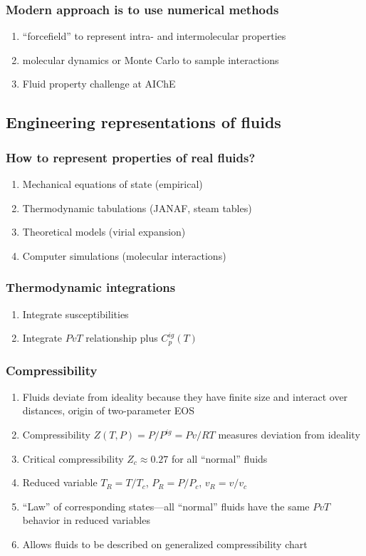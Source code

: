 \documentclass[11pt]{article}
\begin{document}
\subsubsection{Modern approach is to use numerical methods}
\label{sec:orgd56a107}
\begin{enumerate}
\item ``forcefield'' to represent intra- and intermolecular properties
\item molecular dynamics or Monte Carlo to sample interactions
\item Fluid property challenge at AIChE
\end{enumerate}

\subsection{Engineering representations of fluids}
\label{sec:org09a5cad}
\subsubsection{How to represent properties of real fluids?}
\label{sec:org91c2dec}
\begin{enumerate}
\item Mechanical equations of state (empirical)
\item Thermodynamic tabulations (JANAF, steam tables)
\item Theoretical models (virial expansion)
\item Computer simulations (molecular interactions)
\end{enumerate}

\subsubsection{Thermodynamic integrations}
\label{sec:org76ee34d}
\begin{enumerate}
\item Integrate susceptibilities
\item Integrate \(PvT\) relationship plus \(C_p^{ig}(T)\)
\end{enumerate}

\subsubsection{Compressibility}
\label{sec:org3f0c5f5}
\begin{enumerate}
\item Fluids deviate from ideality because they have finite size and interact over distances, origin of two-parameter EOS
\item Compressibility \(Z(T,P)=P/P^{ig}=Pv/RT\) measures deviation from ideality
\item Critical compressibility \(Z_c \approx 0.27\) for all ``normal'' fluids
\item Reduced variable \(T_R=T/T_c\), \(P_R = P/P_c\), \(v_R = v/v_c\)
\item ``Law'' of corresponding states---all ``normal'' fluids have the same \(PvT\) behavior in reduced variables
\item Allows fluids to be described on generalized compressibility chart
\end{enumerate}
\end{document}
